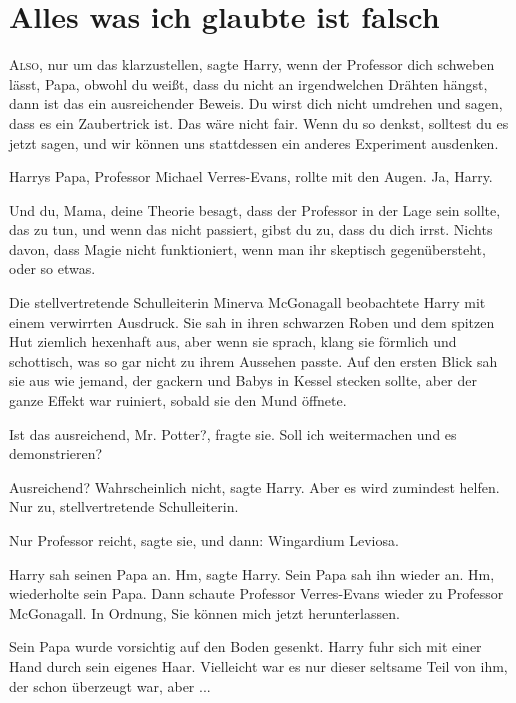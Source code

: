 \chapter{Alles was ich glaubte ist falsch}

\lettrine{\loq A}{lso}, nur um das klarzustellen\grqq{}, sagte Harry, \glqq wenn
der Professor dich schweben lässt, Papa, obwohl du weißt, dass du nicht an
irgendwelchen Drähten hängst, dann ist das ein ausreichender Beweis. Du wirst
dich nicht umdrehen und sagen, dass es ein Zaubertrick ist. Das wäre nicht
fair. Wenn du so denkst, solltest du es jetzt sagen, und wir können uns
stattdessen ein anderes Experiment ausdenken.\grqq{}

Harrys Papa, Professor Michael Verres-Evans, rollte mit den Augen. \glqq{}Ja,
Harry.\grqq{}

\glqq{}Und du, Mama, deine Theorie besagt, dass der Professor in der Lage sein
sollte, das zu tun, und wenn das nicht passiert, gibst du zu, dass du dich
irrst. Nichts davon, dass Magie nicht funktioniert, wenn man ihr skeptisch
gegenübersteht, oder so etwas.\grqq{}

Die stellvertretende Schulleiterin Minerva McGonagall beobachtete Harry mit
einem verwirrten Ausdruck. Sie sah in ihren schwarzen Roben und dem spitzen Hut
ziemlich hexenhaft aus, aber wenn sie sprach, klang sie förmlich und schottisch,
was so gar nicht zu ihrem Aussehen passte. Auf den ersten Blick sah sie aus wie
jemand, der gackern und Babys in Kessel stecken sollte, aber der ganze Effekt
war ruiniert, sobald sie den Mund öffnete.

\glqq{}Ist das ausreichend, Mr. Potter?\grqq{}, fragte sie. \glqq{}Soll ich
weitermachen und es demonstrieren?\grqq{}

\glqq{}Ausreichend? Wahrscheinlich nicht\grqq{}, sagte Harry. \glqq{}Aber es
wird zumindest helfen. Nur zu, stellvertretende Schulleiterin.\grqq{}

\glqq{}Nur Professor reicht\grqq{}, sagte sie, und dann: \glqq{}Wingardium
Leviosa.\grqq{}

Harry sah seinen Papa an. \glqq{}Hm\grqq{}, sagte Harry. Sein Papa sah ihn
wieder an. \glqq{}Hm\grqq{}, wiederholte sein Papa. Dann schaute Professor
Verres-Evans wieder zu Professor McGonagall. \glqq{}In Ordnung, Sie können mich
jetzt herunterlassen.\grqq{}

Sein Papa wurde vorsichtig auf den Boden gesenkt. Harry fuhr sich mit einer
Hand durch sein eigenes Haar. Vielleicht war es nur dieser seltsame Teil von
ihm, der schon überzeugt war, aber ...

